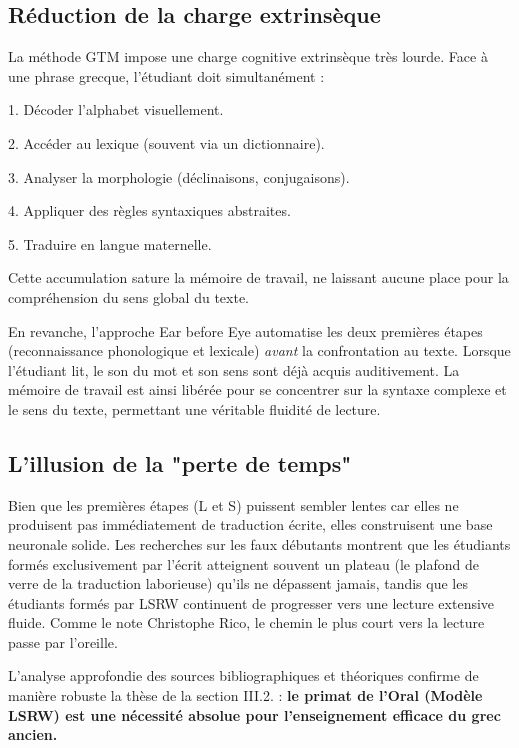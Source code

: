\subsection{Réduction de la charge extrinsèque}

La méthode GTM impose une charge cognitive extrinsèque très lourde. Face à une phrase grecque,
l'étudiant doit simultanément :

1. Décoder l'alphabet visuellement.

2. Accéder au lexique (souvent via un dictionnaire).

3. Analyser la morphologie (déclinaisons, conjugaisons).

4. Appliquer des règles syntaxiques abstraites.

5. Traduire en langue maternelle.

Cette accumulation sature la mémoire de travail, ne laissant aucune place pour la compréhension du
sens global du texte.\cite{III-2-1-ref62}

En revanche, l'approche \og Ear before Eye\fg{} automatise les deux premières étapes (reconnaissance
phonologique et lexicale) \textit{avant} la confrontation au texte. Lorsque l'étudiant lit, le son
du mot et son sens sont déjà acquis auditivement. La mémoire de travail est ainsi libérée pour se
concentrer sur la syntaxe complexe et le sens du texte, permettant une véritable fluidité de
lecture.\cite{III-2-1-ref64}



\subsection{L'illusion de la "perte de temps"}

Bien que les premières étapes (L et S) puissent sembler lentes car elles ne produisent pas
immédiatement de traduction écrite, elles construisent une base neuronale solide. Les recherches sur
les \og faux débutants\fg{} montrent que les étudiants formés exclusivement par l'écrit atteignent
souvent un plateau (le \og plafond de verre\fg{} de la traduction laborieuse) qu'ils ne dépassent
jamais, tandis que les étudiants formés par LSRW continuent de progresser vers une lecture extensive
fluide.\cite{III-2-1-ref66} Comme le note Christophe Rico, \og le chemin le plus court vers la
lecture passe par l'oreille\fg{}.\cite{III-2-1-ref52}

L'analyse approfondie des sources bibliographiques et théoriques confirme de manière robuste la
thèse de la section III.2.\cite{III-2-1-ref1} : \textbf{le primat de l'Oral (Modèle LSRW) est une
nécessité absolue pour l'enseignement efficace du grec ancien.}

